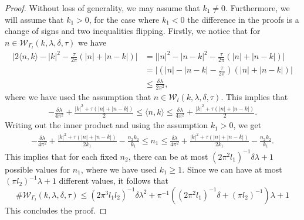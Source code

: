 \documentclass[11pt,twoside,reqno]{amsart}
\newcommand{\1}{\mathrm{\mathbf{1}}}
\numberwithin{equation}{section}
\theoremstyle{plain}
\theoremstyle{definition}
\theoremstyle{remark}
\begin{document}
\begin{proof}
    Without loss of generality, we may assume that $k_1 \neq0 $. Furthermore, we will assume that $k_1>0$, for the case where $k_1<0$ the difference in the proofs is a change of signs and two inequalities flipping. Firstly, we notice that for $n\in \mathcal{W}_{\Gamma_l}(k,\lambda,\delta,\tau) $ we have
    \begin{equation*}
    \begin{aligned}
       \Big| 2\langle n,k \rangle - | k |^2 - \frac{\tau}{2\pi} (|n| + |n-k|) \Big|
       &=\Big| |n|^2 - |n-k|^2 - \frac{\tau}{2\pi} (|n| + |n-k|)\Big|
        \\
        &=\Big|(|n| - |n - k| - \frac{\tau}{2\pi})(|n| +|n-k|) \Big|
        \\
        &\leq \frac{\delta \lambda}{2\pi^2},
    \end{aligned}
    \end{equation*}
    where we have used the assumption that $n\in \mathcal{W}_{l}(k,\lambda,\delta,\tau) $. This implies that 
    \begin{equation*}
    \begin{aligned}
       -\frac{\delta \lambda}{4\pi^2}+\frac{  | k |^2 + \tau (|n| + |n-k|)}{2} \leq \langle n,k \rangle \leq \frac{\delta \lambda}{4\pi^2}+ \frac{ | k |^2 + \tau (|n| + |n-k|)}{2}.
    \end{aligned}
    \end{equation*}
    Writing out the inner product and using the assumption $k_1>0$, we get
    \begin{equation*}
    \begin{aligned}
      -\frac{\delta \lambda}{4\pi^2}+ \frac{| k |^2 + \tau (|n| + |n-k|)}{2 k_1} - \frac{n_2k_2}{k_1} \leq  n_1 \leq \frac{\delta \lambda}{4\pi^2}+\frac{ | k |^2 + \tau (|n| + |n-k|)}{2 k_1} - \frac{n_2k_2}{k_1}. 
    \end{aligned}
    \end{equation*}
    This implies that for each fixed $n_2$, there can be at most $(2\pi^2 l_1)^{-1} \delta \lambda +1$ possible values for $n_1$, where we have used $k_1\geq 1$. Since we can have at most $  (\pi l_2)^{-1} \lambda +1$ different values, it follows that
    \begin{equation*}
        \#\mathcal{W}_{\Gamma_l}(k,\lambda,\delta,\tau) \leq  (2\pi^3 l_1l_2)^{-1}\delta\lambda^2 +\pi^{-1}((2\pi^2 l_1)^{-1}\delta +(\pi l_2)^{-1})\lambda +1
    \end{equation*}
    This concludes the proof.
\end{proof}
\end{document}
